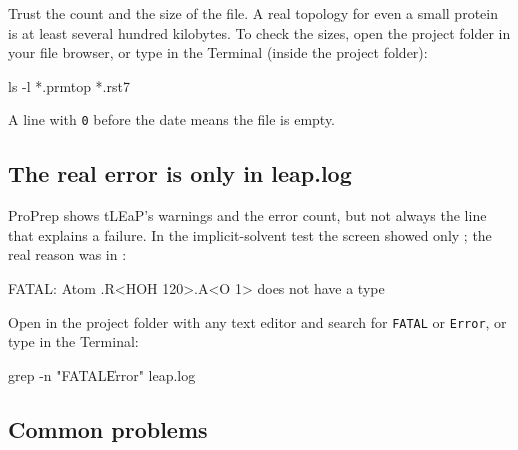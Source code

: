 Trust the  count and the size of the file. A real topology
for even a small protein is at least several hundred kilobytes. To check the
sizes, open the project folder in your file browser, or type in the Terminal
(inside the project folder):

\begin{terminal}
ls -l *.prmtop *.rst7
\end{terminal}

A line with \texttt{0} before the date means the file is empty.

\subsection{The real error is only in leap.log}

ProPrep shows tLEaP's warnings and the error count, but not always the line
that explains a failure. In the implicit-solvent test the screen showed only
; the real reason was in :

\begin{screen}
FATAL: Atom .R<HOH 120>.A<O 1> does not have a type
\end{screen}

Open  in the project folder with any text editor and search for
\texttt{FATAL} or \texttt{Error}, or type in the Terminal:

\begin{terminal}
grep -n "FATAL\|Error" leap.log
\end{terminal}

\subsection{Common problems}


